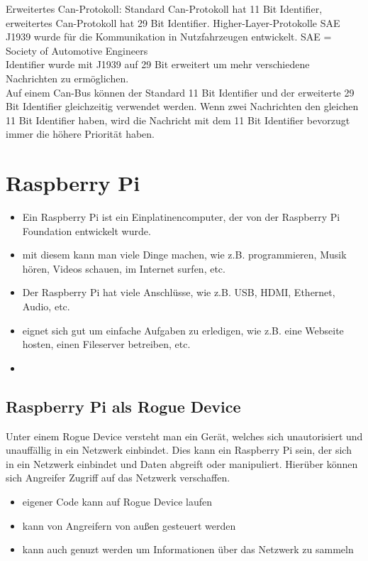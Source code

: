 Erweitertes Can-Protokoll: 
Standard Can-Protokoll hat 11 Bit Identifier, erweitertes Can-Protokoll hat 29 Bit Identifier.
Higher-Layer-Protokolle SAE J1939 wurde für die Kommunikation in Nutzfahrzeugen entwickelt.
SAE = Society of Automotive Engineers\\
Identifier wurde mit J1939 auf 29 Bit erweitert um mehr verschiedene Nachrichten zu ermöglichen.\\
Auf einem Can-Bus können der Standard 11 Bit Identifier und der erweiterte 29 Bit Identifier gleichzeitig verwendet werden.
Wenn zwei Nachrichten den gleichen 11 Bit Identifier haben, wird die Nachricht mit dem 11 Bit Identifier bevorzugt immer die
höhere Priorität haben.


\section{Raspberry Pi}
\begin{itemize}
    \item Ein Raspberry Pi ist ein Einplatinencomputer, der von der Raspberry Pi Foundation entwickelt wurde.
    \item mit diesem kann man viele Dinge machen, wie z.B. programmieren, Musik hören, Videos schauen, im Internet surfen, etc.
    \item Der Raspberry Pi hat viele Anschlüsse, wie z.B. USB, HDMI, Ethernet, Audio, etc.
    \item eignet sich gut um einfache Aufgaben zu erledigen, wie z.B. eine Webseite hosten, einen Fileserver betreiben, etc.
    \item 
\end{itemize}

\subsection{Raspberry Pi als Rogue Device}
Unter einem Rogue Device versteht man ein Gerät, welches sich unautorisiert und unauffällig in ein Netzwerk einbindet.
Dies kann ein Raspberry Pi sein, der sich in ein Netzwerk einbindet und Daten abgreift oder manipuliert. Hierüber können 
sich Angreifer Zugriff auf das Netzwerk verschaffen. 
\begin{itemize}
    \item eigener Code kann auf Rogue Device laufen
    \item kann von Angreifern von außen gesteuert werden
    \item kann auch genuzt werden um Informationen über das Netzwerk zu sammeln
\end{itemize}

